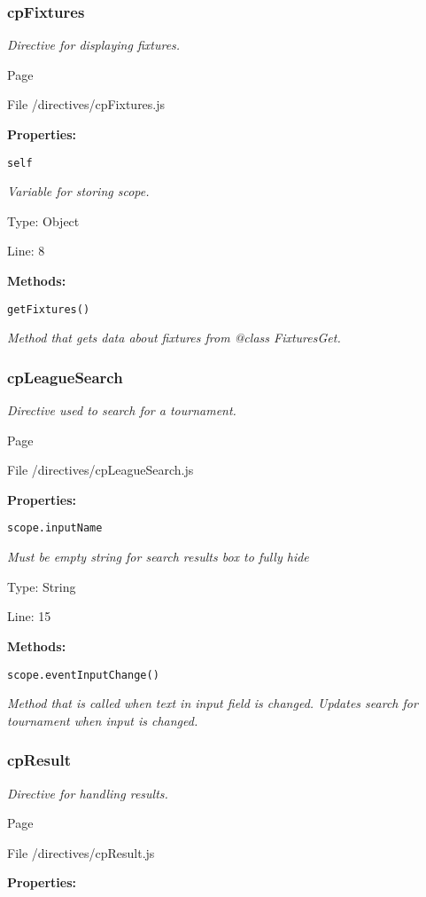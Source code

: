 \subsubsection{cpFixtures}
\textit{Directive for displaying fixtures.}

Page \pageref{cpFixtures.js}

File /directives/cpFixtures.js

\textbf{Properties:}

\texttt{self}

{\scriptsize
\textit{Variable for storing scope.}

Type: Object

Line: 8

}
\textbf{Methods:}

\texttt{getFixtures()}

{\scriptsize
\textit{Method that gets data about fixtures from @class FixturesGet.}

}

\subsubsection{cpLeagueSearch}
\textit{Directive used to search for a tournament.}

Page \pageref{cpLeagueSearch.js}

File /directives/cpLeagueSearch.js

\textbf{Properties:}

\texttt{scope.inputName}

{\scriptsize
\textit{Must be empty string for search results box to fully hide}

Type: String

Line: 15

}
\textbf{Methods:}

\texttt{scope.eventInputChange()}

{\scriptsize
\textit{Method that is called when text in input field is changed.
Updates search for tournament when input is changed.}

}

\subsubsection{cpResult}
\textit{Directive for handling results.}

Page \pageref{cpResult.js}

File /directives/cpResult.js

\textbf{Properties:}

